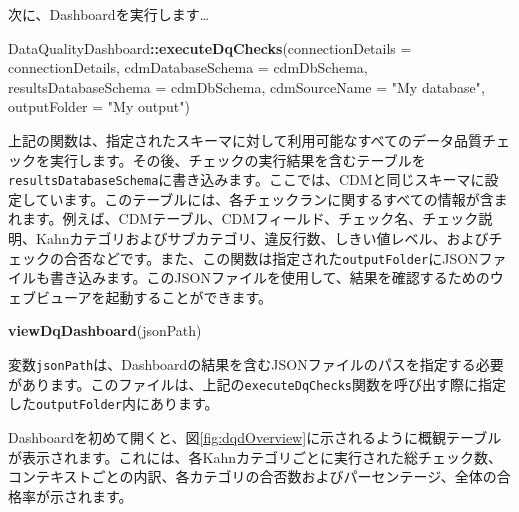\documentclass[
  11pt]{book}
\newenvironment{Shaded}{\begin{snugshade}}{\end{snugshade}}
\newcommand{\AttributeTok}[1]{\textcolor[rgb]{0.13,0.29,0.53}{#1}}
\newcommand{\FunctionTok}[1]{\textcolor[rgb]{0.13,0.29,0.53}{\textbf{#1}}}
\newcommand{\NormalTok}[1]{#1}
\newcommand{\SpecialCharTok}[1]{\textcolor[rgb]{0.81,0.36,0.00}{\textbf{#1}}}
\newcommand{\StringTok}[1]{\textcolor[rgb]{0.31,0.60,0.02}{#1}}
\theoremstyle{definition}
\theoremstyle{definition}
\theoremstyle{definition}
\theoremstyle{definition}
\theoremstyle{remark}
\begin{document}
次に、Dashboardを実行します\ldots{}

\begin{Shaded}
\begin{Highlighting}[]
\NormalTok{DataQualityDashboard}\SpecialCharTok{::}\FunctionTok{executeDqChecks}\NormalTok{(}\AttributeTok{connectionDetails =}\NormalTok{ connectionDetails,}
                                      \AttributeTok{cdmDatabaseSchema =}\NormalTok{ cdmDbSchema,}
                                      \AttributeTok{resultsDatabaseSchema =}\NormalTok{ cdmDbSchema,}
                                      \AttributeTok{cdmSourceName =} \StringTok{"My database"}\NormalTok{,}
                                      \AttributeTok{outputFolder =} \StringTok{"My output"}\NormalTok{)}
\end{Highlighting}
\end{Shaded}

上記の関数は、指定されたスキーマに対して利用可能なすべてのデータ品質チェックを実行します。その後、チェックの実行結果を含むテーブルを\texttt{resultsDatabaseSchema}に書き込みます。ここでは、CDMと同じスキーマに設定しています。このテーブルには、各チェックランに関するすべての情報が含まれます。例えば、CDMテーブル、CDMフィールド、チェック名、チェック説明、Kahnカテゴリおよびサブカテゴリ、違反行数、しきい値レベル、およびチェックの合否などです。また、この関数は指定された\texttt{outputFolder}にJSONファイルも書き込みます。このJSONファイルを使用して、結果を確認するためのウェブビューアを起動することができます。

\begin{Shaded}
\begin{Highlighting}[]
\FunctionTok{viewDqDashboard}\NormalTok{(jsonPath)}
\end{Highlighting}
\end{Shaded}

変数\texttt{jsonPath}は、Dashboardの結果を含むJSONファイルのパスを指定する必要があります。このファイルは、上記の\texttt{executeDqChecks}関数を呼び出す際に指定した\texttt{outputFolder}内にあります。

Dashboardを初めて開くと、図\ref{fig:dqdOverview}に示されるように概観テーブルが表示されます。これには、各Kahnカテゴリごとに実行された総チェック数、コンテキストごとの内訳、各カテゴリの合否数およびパーセンテージ、全体の合格率が示されます。
\end{document}
